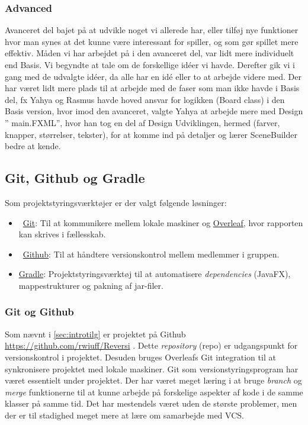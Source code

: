 \subsubsection {Advanced}
Avanceret del bajet på at udvikle noget vi allerede har, eller tilføj nye funktioner hvor man synes at det kunne være interessant for spiller, og som gør spillet mere effektiv.
Måden vi har arbejdet på i den avanceret del, var lidt mere individuelt end Basis. 
Vi begyndte at tale om de forskellige idéer vi havde. Derefter gik vi i gang med de udvalgte idéer, da alle har en idé eller to at arbejde videre med.
Der har været lidt mere plads til at arbejde med de faser som man ikke havde i Basis del, fx Yahya og Rasmus havde hoved ansvar for logikken (Board class) i den Basis version, hvor imod den avanceret, valgte Yahya at arbejde mere med Design ” main.FXML”, hvor han tog en del af Design Udviklingen, hermed (farver, knapper, størrelser, tekster), for at komme ind på detaljer og lærer SceneBuilder bedre at kende.







\subsection{Git, Github og Gradle}\label{sec:GGG}
Som projektstyringsværktøjer er der valgt følgende løsninger:
\begin{itemize}
    \item \faGit \ \href{https://git-scm.com/}{Git}: Til at kommunikere mellem lokale maskiner og \href{https://www.overleaf.com/}{Overleaf}, hvor rapporten kan skrives i fællesskab.
    \item \faGithub \ \href{https://github.com/}{Github}: Til at håndtere versionskontrol mellem medlemmer i gruppen.
    \item \href{https://gradle.org/}{Gradle}: Projektstyringsværktøj til at automatisere \emph{dependencies} (JavaFX), mappestrukturer og pakning af jar-filer.
\end{itemize}
\subsubsection{Git og Github}
Som nævnt i \cref{sec:introtilg} er projektet på Github \href{https://github.com/rwiuff/Reversi}{https://github.com/rwiuff/Reversi} . Dette \emph{repository} (repo) er udgangspunkt for versionskontrol i projektet. Desuden bruges Overleafs Git integration til at synkronisere projektet med lokale maskiner. Git som versionstyringsprogram har været essentielt under projektet. Der har været meget læring i at bruge \emph{branch} og \emph{merge} funktionerne til at kunne arbejde på forskelige aspekter af kode i de samme klasser på samme tid. Det har mestendels været uden de største problemer, men der er til stadighed meget mere at lære om samarbejde med VCS.
